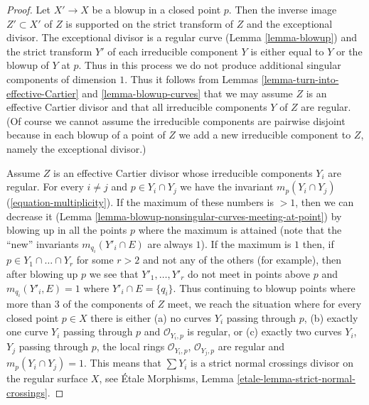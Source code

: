 \documentclass[10pt,a4paper]{amsart}
\theoremstyle{plain}
\theoremstyle{definition}
\theoremstyle{remark}
\numberwithin{equation}{subsection}
\begin{document}
\begin{proof}
Let $X' \to X$ be a blowup in a closed point $p$. Then the inverse image
$Z' \subset X'$ of $Z$ is supported on the strict transform of $Z$ and
the exceptional divisor. The exceptional divisor is a regular curve
(Lemma \ref{lemma-blowup}) and the strict transform $Y'$ of each irreducible
component $Y$ is either equal to $Y$ or the blowup of $Y$ at $p$.
Thus in this process we do not produce additional singular components
of dimension $1$. Thus it follows from
Lemmas \ref{lemma-turn-into-effective-Cartier} and \ref{lemma-blowup-curves}
that we may assume $Z$ is an effective Cartier divisor and
that all irreducible components $Y$ of $Z$ are regular.
(Of course we cannot assume the irreducible components are
pairwise disjoint because in each blowup of a point of $Z$
we add a new irreducible component to $Z$, namely the exceptional divisor.)

\medskip\noindent
Assume $Z$ is an effective Cartier divisor whose irreducible components
$Y_i$ are regular. For every $i \not = j$
and $p \in Y_i \cap Y_j$ we have the invariant
$m_p(Y_i \cap Y_j)$ (\ref{equation-multiplicity}).
If the maximum of these numbers is $> 1$, then we can decrease
it (Lemma \ref{lemma-blowup-nonsingular-curves-meeting-at-point})
by blowing up in all the points $p$ where the maximum is attained
(note that the ``new'' invariants $m_{q_i}(Y'_i \cap E)$ are always $1$).
If the maximum is $1$ then, if $p \in Y_1 \cap \ldots \cap Y_r$
for some $r > 2$ and not any of the others (for example), then after
blowing up $p$ we see that $Y'_1, \ldots, Y'_r$ do not meet in points
above $p$ and $m_{q_i}(Y'_i, E) = 1$ where $Y'_i \cap E = \{q_i\}$.
Thus continuing to blowup points where more than $3$
of the components of $Z$ meet, we reach the situation where
for every closed point $p \in X$ there is either
(a) no curves $Y_i$ passing through $p$,
(b) exactly one curve $Y_i$ passing through $p$ and $\mathcal{O}_{Y_i, p}$
is regular, or (c) exactly two curves $Y_i$, $Y_j$ passing through
$p$, the local rings $\mathcal{O}_{Y_i, p}$, $\mathcal{O}_{Y_j, p}$
are regular and $m_p(Y_i \cap Y_j) = 1$.
This means that $\sum Y_i$ is a strict normal crossings
divisor on the regular surface $X$, see
\'Etale Morphisms, Lemma
\ref{etale-lemma-strict-normal-crossings}.
\end{proof}
\end{document}

